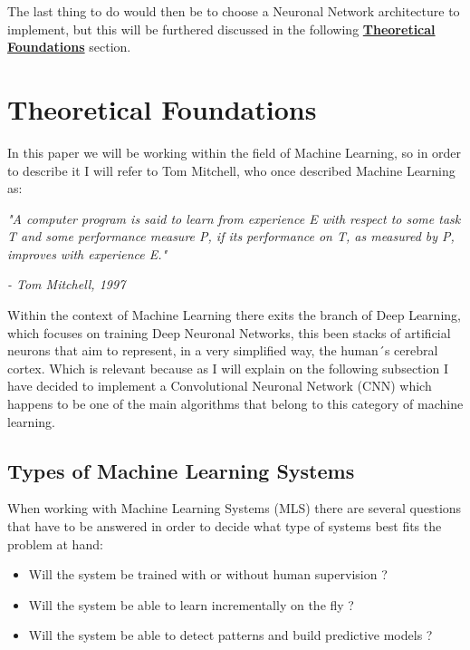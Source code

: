\documentclass[12pt, a4paper]{article}
\begin{document}
	The last thing to do would then be to choose a Neuronal Network architecture to implement, but this will be furthered discussed in the following \hyperref[sec:TheoreticalBases]{\textbf{Theoretical Foundations}} section.
	
	\clearpage
	
	\section{Theoretical Foundations}
	\label{sec:TheoreticalBases}
	
	In this paper we will be working within the field of Machine Learning, so in order to describe it I will refer to Tom Mitchell, who once described Machine Learning as: 
	
	\textit{"A computer program is said to learn from experience E with respect to some task T and some performance measure P, if its performance on T, as measured by P, improves with experience E."}
	\begin{flushright}
		\textit{- Tom Mitchell, 1997 \cite{handsonmachinelearning}}
	\end{flushright}
	
	Within the context of Machine Learning there exits the branch of Deep Learning, which focuses on training Deep Neuronal Networks, this been stacks of artificial neurons that aim to represent, in a very simplified way, the human´s cerebral cortex. Which is relevant because as I will explain on the following subsection I have decided to implement a Convolutional Neuronal Network (CNN) which happens to be one of the main algorithms that belong to this category of machine learning.
	
	
	\clearpage
	
	\subsection{Types of Machine Learning Systems }
	
	When working with Machine Learning Systems (MLS) there are several questions that have to be answered in order to decide what type of systems best fits the problem at hand: \cite{handsonmachinelearning}
	
	\begin{itemize}
		
		\item Will the system be trained with or without human supervision ?
		
		\item Will the system be able to learn incrementally on the fly ?
		
		\item Will the system be able to detect patterns and build predictive models ?
		
	\end{itemize}
	
\end{document}

